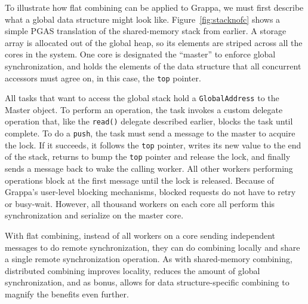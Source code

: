 To illustrate how flat combining can be applied to Grappa, we must first describe what a global data structure might look like. Figure~\ref{fig:stacknofc} shows a simple PGAS translation of the shared-memory stack from earlier. A storage array is allocated out of the global heap, so its elements are striped across all the cores in the system. One core is designated the ``master'' to enforce global synchronization, and holds the elements of the data structure that all concurrent accessors must agree on, in this case, the \texttt{top} pointer.

All tasks that want to access the global stack hold a \texttt{GlobalAddress} to the Master object. To perform an operation, the task invokes a custom delegate operation that, like the \texttt{read()} delegate described earlier, blocks the task until complete. To do a \texttt{push}, the task must send a message to the master to acquire the lock. If it succeeds, it follows the \texttt{top} pointer, writes its new value to the end of the stack, returns to bump the \texttt{top} pointer and release the lock, and finally sends a message back to wake the calling worker. All other workers performing operations block at the first message until the lock is released. Because of Grappa's user-level blocking mechanisms, blocked requests do not have to retry or busy-wait. However, all thousand workers on each core all perform this synchronization and serialize on the master core.

With flat combining, instead of all workers on a core sending independent messages to do remote synchronization, they can do combining locally and share a single remote synchronization operation. 
As with shared-memory combining, distributed combining improves locality, reduces the amount of global synchronization, and as bonus, allows for data structure-specific combining to magnify the benefits even further.



